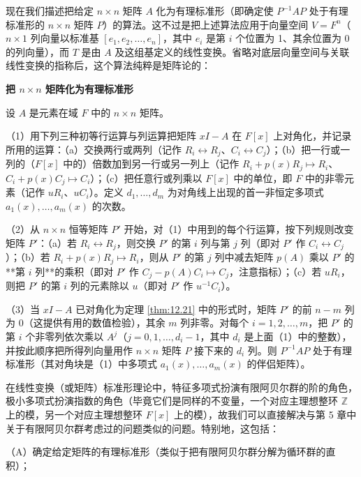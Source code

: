 现在我们描述把给定 \(n \times n\) 矩阵 \(A\) 化为有理标准形（即确定使 \(P^{-1}AP\) 处于有理标准形的 \(n \times n\) 矩阵 \(P\)）的算法。这不过是把上述算法应用于向量空间 \(V = F^n\)（\(n \times 1\) 列向量以标准基 \([e_1, e_2, \ldots, e_n]\)，其中 \(e_i\) 是第 \(i\) 个位置为 1、其余位置为 0 的列向量），而 \(T\) 是由 \(A\) 及这组基定义的线性变换。省略对底层向量空间与关联线性变换的指称后，这个算法纯粹是矩阵论的：

\noindent\textbf{把 \(n \times n\) 矩阵化为有理标准形}

设 \(A\) 是元素在域 \(F\) 中的 \(n \times n\) 矩阵。

（1）用下列三种初等行运算与列运算把矩阵 \(xI-A\) 在 \(F[x]\) 上对角化，并记录所用的运算：（a）交换两行或两列（记作 \(R_i \leftrightarrow R_j\)、\(C_i \leftrightarrow C_j\)）；（b）把一行或一列的（\(F[x]\) 中的）倍数加到另一行或另一列上（记作 \(R_i+p(x)R_j \mapsto R_i\)、\(C_i+p(x)C_j \mapsto C_i\)）；（c）把任意行或列乘以 \(F[x]\) 中的单位，即 \(F\) 中的非零元素（记作 \(uR_i\)、\(uC_i\)）。定义 \(d_1, \ldots, d_m\) 为对角线上出现的首一非恒定多项式 \(a_1(x), \ldots, a_m(x)\) 的次数。

（2）从 \(n \times n\) 恒等矩阵 \(P'\) 开始，对（1）中用到的每个行运算，按下列规则改变矩阵 \(P'\)：（a）若 \(R_i \leftrightarrow R_j\)，则交换 \(P'\) 的第 \(i\) 列与第 \(j\) 列（即对 \(P'\) 作 \(C_i \leftrightarrow C_j\)）；（b）若 \(R_i+p(x)R_j \mapsto R_i\)，则从 \(P'\) 的第 \(j\) 列中减去矩阵 \(p(A)\) 乘以 \(P'\) 的**第 \(i\) 列**的乘积（即对 \(P'\) 作 \(C_j-p(A)C_i \mapsto C_j\)，注意指标）；（c）若 \(uR_i\)，则把 \(P'\) 的第 \(i\) 列的元素除以 \(u\)（即对 \(P'\) 作 \(u^{-1}C_i\)）。

（3）当 \(xI-A\) 已对角化为定理 \ref{thm:12.21} 中的形式时，矩阵 \(P'\) 的前 \(n-m\) 列为 0（这提供有用的数值检验），其余 \(m\) 列非零。对每个 \(i = 1, 2, \ldots, m\)，把 \(P'\) 的第 \(i\) 个非零列依次乘以 \(A^j\)（\(j = 0, 1, \ldots, d_i-1\)，其中 \(d_i\) 是上面（1）中的整数），并按此顺序把所得列向量用作 \(n \times n\) 矩阵 \(P\) 接下来的 \(d_i\) 列。则 \(P^{-1}AP\) 处于有理标准形（其对角块是（1）中多项式 \(a_1(x), \ldots, a_m(x)\) 的伴侣矩阵）。

在线性变换（或矩阵）标准形理论中，特征多项式扮演有限阿贝尔群的阶的角色，极小多项式扮演指数的角色（毕竟它们是同样的不变量，一个对应主理想整环 \(\mathbb{Z}\) 上的模，另一个对应主理想整环 \(F[x]\) 上的模），故我们可以直接解决与第 5 章中关于有限阿贝尔群考虑过的问题类似的问题。特别地，这包括：

（A）确定给定矩阵的有理标准形（类似于把有限阿贝尔群分解为循环群的直积）；

